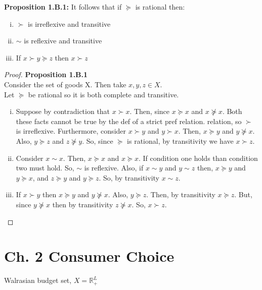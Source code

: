 \documentclass[12pt]{article}
\newcommand{\R}{\mathbb{R}}
\begin{document}
\textbf{Proposition 1.B.1:} It follows that if $\succeq$ is rational then:
\begin{enumerate}[i.]
\item $\succ$ is irreflexive and transitive
\item $\sim$ is reflexive and transitive
\item If $x \succ y \succeq z$ then $x \succ z$
\end{enumerate}


\begin{proof} \textbf{Proposition 1.B.1}
\\ Consider the set of goods X. Then take $x,y,z \in X$. 
\\Let $\succeq$ be rational so it is both complete and transitive.
\begin{enumerate}[i.]
\item Suppose by contradiction that $x \succ x$. Then, since $x \succeq x$ and $x \not\succeq x$. Both these facts cannot be true by the def of a strict pref relation. relation, so $\succ$ is irreflexive. Furthermore, consider $x \succ y$ and $y \succ x$. Then, $ x \succeq y$ and $y \not\succeq x$. Also, $ y \succeq z$ and $z \not\succeq y$. So, since $\succeq$ is rational, by transitivity we have $x \succ z$.
\item Consider $x \sim x$. Then,  $x \succeq x$ and $x \succeq x$. If condition one holds than condition two must hold. So, $\sim$ is reflexive. Also, if $x \sim y$ and $y \sim z$ then, $x \succeq y$ and $y \succeq x$, and $z \succeq y$ and $y \succeq z$. So, by transitivity $x \sim z$.
\item If $x \succ y $ then $x \succeq y$ and $y \not\succeq x$. Also, $y \succeq z$. Then, by transitivity $x \succeq z$. But, since $y \not\succeq x$ then by transitivity $z \not\succeq x$. So, $x \succ z$.
\end{enumerate}
\end{proof}
\section*{Ch. 2 Consumer Choice}
Walrasian budget set, $X = \R_+^L$



\end{document}
